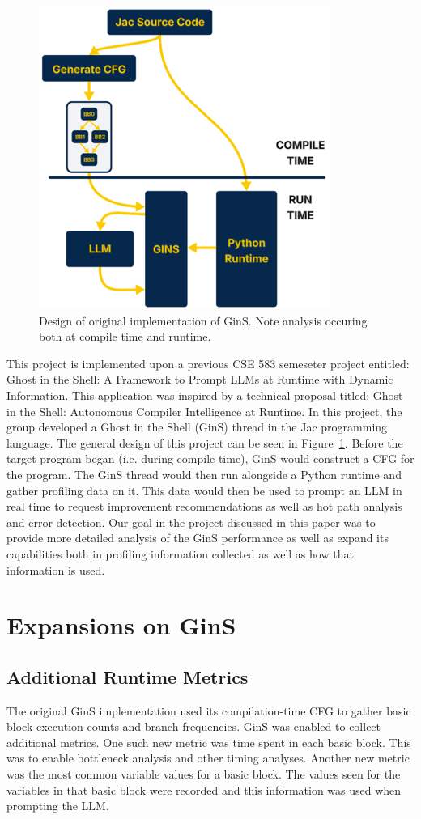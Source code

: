 \documentclass[sigconf,nonacm]{acmart}
\begin{document}
\begin{figure}
    \centering
    \includegraphics[width=0.5\linewidth]{images/Picture1.png}
    \caption{Design of original implementation of GinS. Note analysis occuring both at compile time and runtime.}
    \label{fig:layout}
\end{figure}

This project is implemented upon a previous CSE 583 semeseter project entitled: Ghost in the Shell: A Framework to Prompt LLMs at Runtime with Dynamic Information. \cite{dantanarayana2024gins}
This application was inspired by a technical proposal titled: Ghost in the Shell: Autonomous Compiler Intelligence at Runtime. \cite{mars2025gins}
In this project, the group developed a Ghost in the Shell (GinS) thread in the Jac programming language.
The general design of this project can be seen in Figure~\ref{fig:layout}.
Before the target program began (i.e. during compile time), GinS would construct a CFG for the program.
The GinS thread would then run alongside a Python runtime and gather profiling data on it.
This data would then be used to prompt an LLM in real time to request improvement recommendations as well as hot path analysis and error detection.
Our goal in the project discussed in this paper was to provide more detailed analysis of the GinS performance as well as expand its capabilities both in profiling information collected as well as how that information is used.

\section{Expansions on GinS}

\subsection{Additional Runtime Metrics}
The original GinS implementation used its compilation-time CFG to gather basic block execution counts and branch frequencies.
GinS was enabled to collect additional metrics.
One such new metric was time spent in each basic block.
This was to enable bottleneck analysis and other timing analyses.
Another new metric was the most common variable values for a basic block.
The values seen for the variables in that basic block were recorded and this information was used when prompting the LLM.
\end{document}
